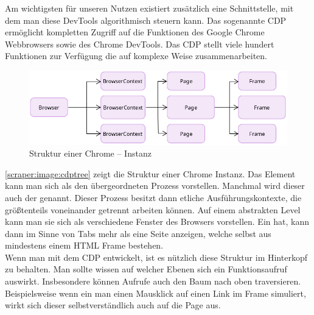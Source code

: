 Am wichtigsten für unseren Nutzen existiert zusätzlich eine Schnittstelle, mit dem man diese DevTools algorithmisch steuern kann. Das sogenannte \ac{CDP} ermöglicht kompletten Zugriff auf die Funktionen des Google Chrome Webbrowsers sowie des Chrome DevTools. Das \ac{CDP} stellt viele hundert Funktionen zur Verfügung die auf komplexe Weise zusammenarbeiten. \cite{cdpexplorer} 

\begin{figure}[h]
	\centering
	\includegraphics[]{images/cdp_overview.png}
	\caption{Struktur einer Chrome – Instanz}
	\label{scraper:image:cdptree}
\end{figure}
\autoref{scraper:image:cdptree} zeigt die Struktur einer Chrome Instanz. Das  Element kann man sich als den übergeordneten Prozess vorstellen. Manchmal wird dieser auch der  genannt. Dieser Prozess besitzt dann etliche Ausführungskontexte, die größtenteils voneinander getrennt arbeiten können. Auf einem abstrakten Level kann man sie sich als verschiedene Fenster des Browsers vorstellen. Ein  hat, kann dann im Sinne von Tabs mehr als eine Seite anzeigen, welche selbst aus mindestens einem HTML Frame bestehen. \\
Wenn man mit dem \ac{CDP} entwickelt, ist es nützlich diese Struktur im Hinterkopf zu behalten. Man sollte wissen auf welcher Ebenen sich ein Funktionsaufruf auswirkt. Insbesondere können Aufrufe auch den Baum nach oben traversieren. Beispielsweise wenn ein man einen Mausklick auf einen Link im Frame simuliert, wirkt sich dieser selbstverständlich auch auf die Page aus.




